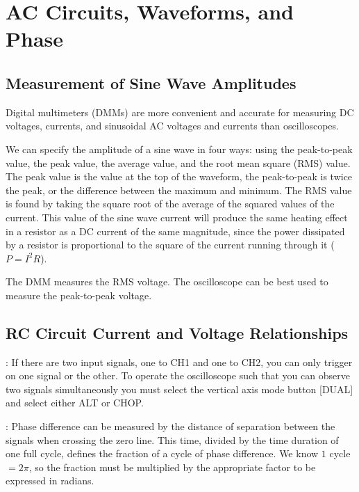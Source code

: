 \documentclass[12pt, a4paper, oneside, openright, titlepage]{book}
\begin{document}
\chapter{AC Circuits, Waveforms, and Phase}

\section{Measurement of Sine Wave Amplitudes}

Digital multimeters (DMMs) are more convenient and accurate for measuring DC voltages, currents, and sinusoidal AC voltages and currents than oscilloscopes.

We can specify the amplitude of a sine wave in four ways: using the peak-to-peak value, the peak value, the average value, and the root mean square (RMS) value. The peak value is the value at the top of the waveform, the peak-to-peak is twice the peak, or the difference between the maximum and minimum. The RMS value is found by taking the square root of the average of the squared values of the current. This value of the sine wave current will produce the same heating effect in a resistor as a DC current of the same magnitude, since the power dissipated by a resistor is proportional to the square of the current running through it ($P = I^2R$).

The DMM measures the RMS voltage. The oscilloscope can be best used to measure the peak-to-peak voltage.

\section{RC Circuit Current and Voltage Relationships}

\begin{rmk}
    : If there are two input signals, one to CH1 and one to CH2, you can only trigger on one signal or the other. To operate the oscilloscope such that you can observe two signals simultaneously you must select the vertical axis mode button [DUAL] and select either ALT or CHOP.
\end{rmk}

\begin{rmk}
    : Phase difference can be measured by the distance of separation between the signals when crossing the zero line. This time, divided by the time duration of one full cycle, defines the fraction of a cycle of phase difference. We know $1$ cycle $= 2\pi$, so the fraction must be multiplied by the appropriate factor to be expressed in radians.
\end{rmk}
\end{document}
